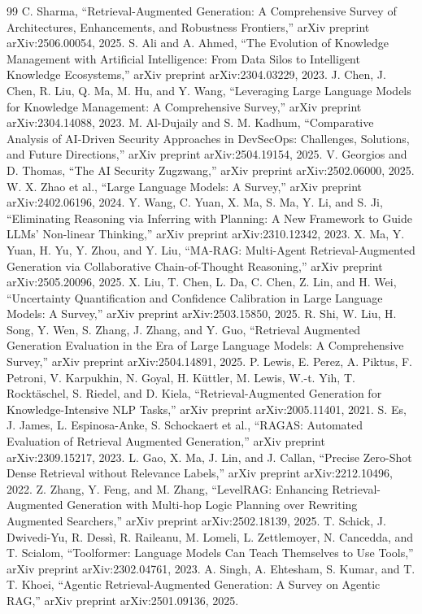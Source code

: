 \documentclass[default]{sn-jnl}%
\begin{document}
\begin{thebibliography}{99}
     C. Sharma, ``Retrieval-Augmented Generation: A Comprehensive Survey of Architectures, Enhancements, and Robustness Frontiers,'' arXiv preprint arXiv:2506.00054, 2025.
     S. Ali and A. Ahmed, ``The Evolution of Knowledge Management with Artificial Intelligence: From Data Silos to Intelligent Knowledge Ecosystems,'' arXiv preprint arXiv:2304.03229, 2023.
     J. Chen, J. Chen, R. Liu, Q. Ma, M. Hu, and Y. Wang, ``Leveraging Large Language Models for Knowledge Management: A Comprehensive Survey,'' arXiv preprint arXiv:2304.14088, 2023.
     M. Al-Dujaily and S. M. Kadhum, ``Comparative Analysis of AI-Driven Security Approaches in DevSecOps: Challenges, Solutions, and Future Directions,'' arXiv preprint arXiv:2504.19154, 2025.
     V. Georgios and D. Thomas, ``The AI Security Zugzwang,'' arXiv preprint arXiv:2502.06000, 2025.
     W. X. Zhao et al., ``Large Language Models: A Survey,'' arXiv preprint arXiv:2402.06196, 2024.
     Y. Wang, C. Yuan, X. Ma, S. Ma, Y. Li, and S. Ji, ``Eliminating Reasoning via Inferring with Planning: A New Framework to Guide LLMs' Non-linear Thinking,'' arXiv preprint arXiv:2310.12342, 2023.
     X. Ma, Y. Yuan, H. Yu, Y. Zhou, and Y. Liu, ``MA-RAG: Multi-Agent Retrieval-Augmented Generation via Collaborative Chain-of-Thought Reasoning,'' arXiv preprint arXiv:2505.20096, 2025.
     X. Liu, T. Chen, L. Da, C. Chen, Z. Lin, and H. Wei, ``Uncertainty Quantification and Confidence Calibration in Large Language Models: A Survey,'' arXiv preprint arXiv:2503.15850, 2025.
     R. Shi, W. Liu, H. Song, Y. Wen, S. Zhang, J. Zhang, and Y. Guo, ``Retrieval Augmented Generation Evaluation in the Era of Large Language Models: A Comprehensive Survey,'' arXiv preprint arXiv:2504.14891, 2025.
     P. Lewis, E. Perez, A. Piktus, F. Petroni, V. Karpukhin, N. Goyal, H. Küttler, M. Lewis, W.-t. Yih, T. Rocktäschel, S. Riedel, and D. Kiela, ``Retrieval-Augmented Generation for Knowledge-Intensive NLP Tasks,'' arXiv preprint arXiv:2005.11401, 2021.
     S. Es, J. James, L. Espinosa-Anke, S. Schockaert et al., ``RAGAS: Automated Evaluation of Retrieval Augmented Generation,'' arXiv preprint arXiv:2309.15217, 2023.
     L. Gao, X. Ma, J. Lin, and J. Callan, ``Precise Zero-Shot Dense Retrieval without Relevance Labels,'' arXiv preprint arXiv:2212.10496, 2022.
     Z. Zhang, Y. Feng, and M. Zhang, ``LevelRAG: Enhancing Retrieval-Augmented Generation with Multi-hop Logic Planning over Rewriting Augmented Searchers,'' arXiv preprint arXiv:2502.18139, 2025.
     T. Schick, J. Dwivedi-Yu, R. Dessì, R. Raileanu, M. Lomeli, L. Zettlemoyer, N. Cancedda, and T. Scialom, ``Toolformer: Language Models Can Teach Themselves to Use Tools,'' arXiv preprint arXiv:2302.04761, 2023.
     A. Singh, A. Ehtesham, S. Kumar, and T. T. Khoei, ``Agentic Retrieval-Augmented Generation: A Survey on Agentic RAG,'' arXiv preprint arXiv:2501.09136, 2025.
\end{thebibliography}
\end{document}
